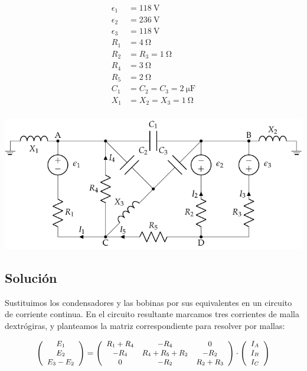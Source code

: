 \documentclass[10pt]{article}
\begin{document}
\begin{minipage}[c]{0.3\linewidth}
  \begin{align*}
    \epsilon_{1}&=\SI{118}{\volt}\\
    \epsilon_{2}&=\SI{236}{\volt}\\
    \epsilon_{3}&=\SI{118}{\volt}\\
    R_{1}&= \SI{4}{\ohm}\\
    R_{2}&=R_{3}=\SI{1}{\ohm}\\
    R_{4}&= \SI{3}{\ohm}\\
    R_{5}&= \SI{2}{\ohm}\\
    C_{1}&=C_{2}=C_{3}=\SI{2}{\micro\farad}\\
    X_1 &= X_2 = X_3 = \SI{1}{\ohm}\\
  \end{align*}
\end{minipage}
\begin{minipage}[c]{0.7\linewidth}
  \includegraphics{../figs/mallas_condensadores.pdf}
\end{minipage}

\subsection*{Solución}
Sustituimos los condensadores y las bobinas por sus equivalentes en un circuito de corriente continua. En el circuito resultante marcamos tres corrientes de malla dextrógiras, y planteamos la matriz correspondiente para resolver por mallas: 

\[
\small{
\left(\begin{array}{c}
    E_1\\
    E_2\\
    E_3 - E_2
  \end{array}\right) = \left(\begin{array}{ccc}
    R_1 + R_4 & -R_4 & 0\\
    -R_4 & R_4 + R_5 + R_2 & -R_{2}\\
    0 & -R_2 & R_2 + R_3
  \end{array}\right) \cdot \left(\begin{array}{c}
    I_{A}\\
    I_{B}\\
    I_{C}
  \end{array}\right)
}
\]
\end{document}
